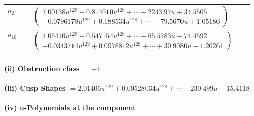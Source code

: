 \documentclass[1p]{elsarticle_modified}
\theoremstyle{definition}
\begin{document}
\begin{tabular}{m{7pt} m{180pt} m{7pt} m{180pt} }
\flushright $a_{2}=$&$\begin{pmatrix}7.00138 u^{129}+0.814010 u^{128}+\cdots-2243.97 u+34.5505\\-0.0796178 u^{129}+0.188534 u^{128}+\cdots-79.5670 u+1.05186\end{pmatrix}$ \\
\flushright $a_{10}=$&$\begin{pmatrix}4.05410 u^{129}+0.547154 u^{128}+\cdots-65.5783 u-74.4592\\-0.0343714 u^{129}+0.0978812 u^{128}+\cdots+30.9080 u-1.20261\end{pmatrix}$\\&\end{tabular}
\flushleft \textbf{(ii) Obstruction class $= -1$}\\~\\
\flushleft \textbf{(iii) Cusp Shapes $= 2.01406 u^{129}+0.00528034 u^{128}+\cdots-230.499 u-15.4118$}\\~\\
\newpage\renewcommand{\arraystretch}{1}
\flushleft \textbf{(iv) u-Polynomials at the component}\newline \\
\end{document}
